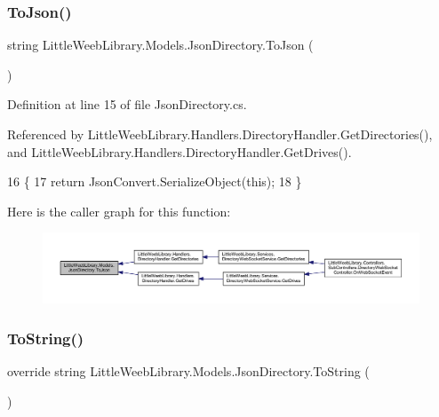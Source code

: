 \subsubsection{\texorpdfstring{To\+Json()}{ToJson()}}
{\footnotesize\ttfamily string Little\+Weeb\+Library.\+Models.\+Json\+Directory.\+To\+Json (\begin{DoxyParamCaption}{ }\end{DoxyParamCaption})}



Definition at line 15 of file Json\+Directory.\+cs.



Referenced by Little\+Weeb\+Library.\+Handlers.\+Directory\+Handler.\+Get\+Directories(), and Little\+Weeb\+Library.\+Handlers.\+Directory\+Handler.\+Get\+Drives().


\begin{DoxyCode}
16         \{
17             \textcolor{keywordflow}{return} JsonConvert.SerializeObject(\textcolor{keyword}{this});
18         \}
\end{DoxyCode}
Here is the caller graph for this function\+:\nopagebreak
\begin{figure}[H]
\begin{center}
\leavevmode
\includegraphics[width=350pt]{class_little_weeb_library_1_1_models_1_1_json_directory_a3527cf5cff598f63b5f95cf7d6158b55_icgraph}
\end{center}
\end{figure}
\mbox{\label{class_little_weeb_library_1_1_models_1_1_json_directory_a8fb3f3abbc3d89fa3a3fc6f7966fc4f9}} 
\subsubsection{\texorpdfstring{To\+String()}{ToString()}}
{\footnotesize\ttfamily override string Little\+Weeb\+Library.\+Models.\+Json\+Directory.\+To\+String (\begin{DoxyParamCaption}{ }\end{DoxyParamCaption})}



